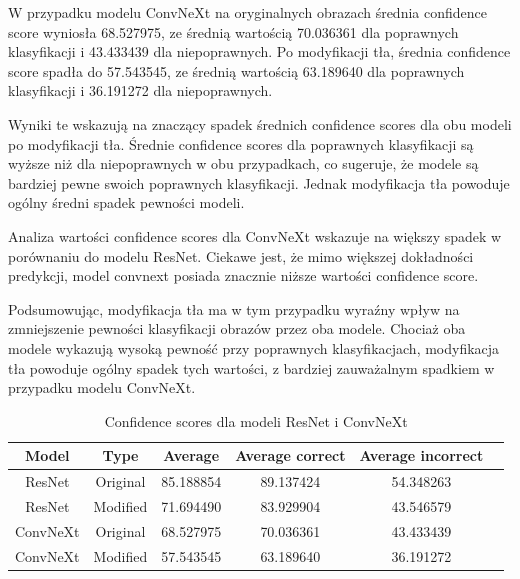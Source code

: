 W przypadku modelu ConvNeXt na oryginalnych obrazach średnia confidence score wyniosła 68.527975, ze średnią wartością 70.036361 dla poprawnych klasyfikacji i 43.433439 dla niepoprawnych. Po modyfikacji tła, średnia confidence score spadła 
do 57.543545, ze średnią wartością 63.189640 dla poprawnych klasyfikacji i 36.191272 dla niepoprawnych.

Wyniki te wskazują na znaczący spadek średnich confidence scores dla obu modeli po modyfikacji tła. Średnie confidence scores dla poprawnych klasyfikacji są wyższe niż dla niepoprawnych w obu przypadkach, co sugeruje, że modele są bardziej 
pewne swoich poprawnych klasyfikacji. Jednak modyfikacja tła powoduje ogólny średni spadek pewności modeli. 

Analiza wartości confidence scores dla ConvNeXt wskazuje na większy spadek w porównaniu do modelu ResNet. Ciekawe jest, że mimo większej dokładności predykcji, model convnext posiada znacznie niższe wartości confidence score. 

Podsumowując, modyfikacja tła ma w tym przypadku wyraźny wpływ na zmniejszenie pewności klasyfikacji obrazów przez oba modele. Chociaż oba modele wykazują wysoką pewność przy poprawnych klasyfikacjach, modyfikacja tła powoduje ogólny spadek 
tych wartości, z bardziej zauważalnym spadkiem w przypadku modelu ConvNeXt. 

\begin{table}
	\centering
	\begin{tabular}{|c|c|c|c|c|c|}
		\hline
		\textbf{Model} & \textbf{Type} & \textbf{Average} & 
		\textbf{Average correct} & \textbf{Average incorrect} \\
		\hline
		ResNet & Original & 85.188854 & 89.137424 & 54.348263 \\
		\hline
		ResNet & Modified & 71.694490 & 83.929904 & 43.546579  \\
		\hline
		ConvNeXt & Original & 68.527975 & 70.036361 & 43.433439 \\
		\hline
		ConvNeXt & Modified & 57.543545 & 63.189640 & 36.191272 \\
		\hline
	\end{tabular}
	\caption{Confidence scores dla modeli ResNet i ConvNeXt}
	\label{tab:model_confidence}
\end{table}

